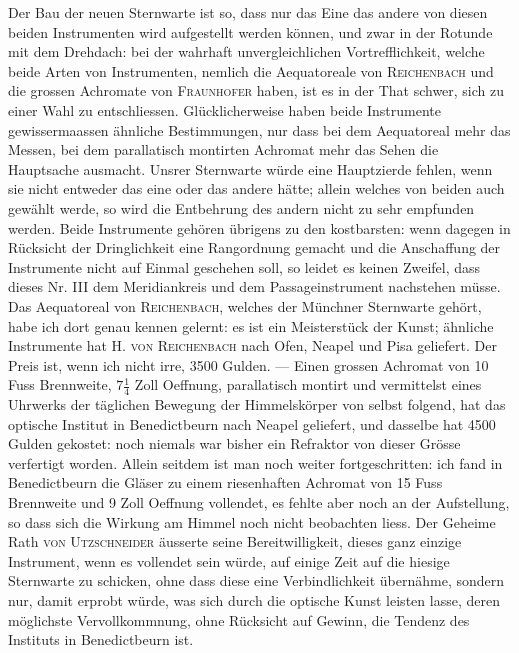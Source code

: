 \noindent\hspace*{\parindent}Der Bau der neuen Sternwarte ist so, dass nur das Eine  das andere von diesen beiden Instrumenten wird aufgestellt werden können, und zwar in der Rotunde mit dem Drehdach: bei der wahrhaft unvergleichlichen Vortrefflichkeit, welche beide Arten von Instrumenten, nemlich die Aequatoreale von \textsc{Reichenbach} und die grossen Achromate von \textsc{Fraunhofer} haben, ist es in der That schwer, sich zu einer Wahl zu entschliessen. Glücklicherweise haben beide Instrumente gewissermaassen ähnliche Bestimmungen, nur dass bei dem Aequatoreal mehr das Messen, bei dem parallatisch montirten Achromat mehr das Sehen die Hauptsache ausmacht. Unsrer Sternwarte würde eine Hauptzierde fehlen, wenn sie nicht entweder das eine oder das andere hätte; allein welches von beiden auch gewählt werde, so wird die Entbehrung des andern nicht zu sehr empfunden werden. Beide Instrumente gehören übrigens zu den kostbarsten: wenn dagegen in Rücksicht der Dringlichkeit eine Rangordnung gemacht und die Anschaffung der Instrumente nicht auf Einmal geschehen soll, so leidet es keinen Zweifel, dass dieses Nr. III dem Meridiankreis und dem Passageinstrument nachstehen müsse. Das Aequatoreal von \textsc{Reichenbach}, welches der Münchner Sternwarte gehört, habe ich dort genau kennen gelernt: es ist ein Meisterstück der Kunst; ähnliche Instrumente hat H. \textsc{von Reichenbach} nach Ofen, Neapel und Pisa geliefert. Der Preis ist, wenn ich nicht irre, 3500 Gulden. — Einen grossen Achromat von 10 Fuss Brennweite, \(7\frac14\) Zoll Oeffnung, parallatisch montirt und vermittelst eines Uhrwerks der täglichen Bewegung der Himmelskörper von selbst folgend, hat das optische Institut in Benedictbeurn nach Neapel geliefert, und dasselbe hat 4500 Gulden gekostet: noch niemals war bisher ein Refraktor von dieser Grösse verfertigt worden. Allein seitdem ist man noch weiter fortgeschritten: ich fand in Benedictbeurn die Gläser zu einem riesenhaften Achromat von 15 Fuss Brennweite und 9 Zoll Oeffnung vollendet, es fehlte aber noch an der Aufstellung, so dass sich die Wirkung am Himmel noch nicht beobachten liess. Der Geheime Rath \textsc{von Utzschneider} äusserte seine Bereitwilligkeit, dieses ganz einzige Instrument, wenn es vollendet sein würde, auf einige Zeit auf die hiesige Sternwarte zu schicken, ohne dass diese eine Verbindlichkeit übernähme,
\clearpage{}
\noindent sondern nur, damit erprobt würde, was sich durch die optische Kunst leisten lasse, deren möglichste Vervollkommnung, ohne Rücksicht auf Gewinn, die Tendenz des Instituts in Benedictbeurn ist.

